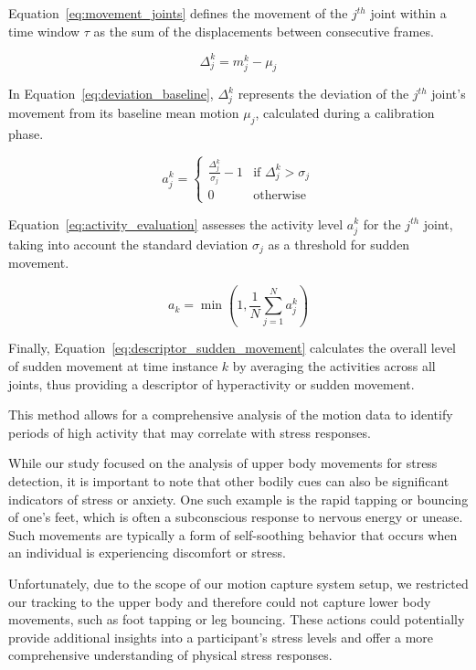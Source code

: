 Equation~\ref{eq:movement_joints} defines the movement of the \( j^{th} \) joint within a time window \( \tau \) as the sum of the displacements between consecutive frames. 

\begin{equation}
\Delta_j^k = m_j^k - \mu_j
\label{eq:deviation_baseline}
\end{equation}

In Equation~\ref{eq:deviation_baseline}, \( \Delta_j^k \) represents the deviation of the \( j^{th} \) joint's movement from its baseline mean motion \( \mu_j \), calculated during a calibration phase.

\begin{equation}
a_j^k = 
\begin{cases} 
  \frac{\Delta_j^k}{\sigma_j} - 1 & \text{if } \Delta_j^k > \sigma_j \\
  0 & \text{otherwise}
\end{cases}
\label{eq:activity_evaluation}
\end{equation}

Equation~\ref{eq:activity_evaluation} assesses the activity level \( a_j^k \) for the \( j^{th} \) joint, taking into account the standard deviation \( \sigma_j \) as a threshold for sudden movement.

\begin{equation}
a_k = \min \left( 1, \frac{1}{N} \sum_{j=1}^{N} a_j^k \right)
\label{eq:descriptor_sudden_movement}
\end{equation}

Finally, Equation~\ref{eq:descriptor_sudden_movement} calculates the overall level of sudden movement at time instance \( k \) by averaging the activities across all joints, thus providing a descriptor of hyperactivity or sudden movement.

This method allows for a comprehensive analysis of the motion data to identify periods of high activity that may correlate with stress responses.


While our study focused on the analysis of upper body movements for stress detection, it is important to note that other bodily cues can also be significant indicators of stress or anxiety. One such example is the rapid tapping or bouncing of one's feet, which is often a subconscious response to nervous energy or unease. Such movements are typically a form of self-soothing behavior that occurs when an individual is experiencing discomfort or stress.

Unfortunately, due to the scope of our motion capture system setup, we restricted our tracking to the upper body and therefore could not capture lower body movements, such as foot tapping or leg bouncing. These actions could potentially provide additional insights into a participant's stress levels and offer a more comprehensive understanding of physical stress responses.


